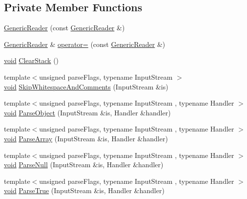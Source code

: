 \subsection*{Private Member Functions}
\begin{DoxyCompactItemize}
\item 
\hyperlink{classGenericReader_ac767384e34b7078fa9f97ba57c884328}{Generic\+Reader} (const \hyperlink{classGenericReader}{Generic\+Reader} \&)
\item 
\hyperlink{classGenericReader}{Generic\+Reader} \& \hyperlink{classGenericReader_ab07a979626cfa121365bb09b61558c11}{operator=} (const \hyperlink{classGenericReader}{Generic\+Reader} \&)
\item 
\hyperlink{imgui__impl__opengl3__loader_8h_ac668e7cffd9e2e9cfee428b9b2f34fa7}{void} \hyperlink{classGenericReader_a1c3db4c395db98714ffb257d559fb28e}{Clear\+Stack} ()
\item 
{\footnotesize template$<$unsigned parse\+Flags, typename Input\+Stream $>$ }\\\hyperlink{imgui__impl__opengl3__loader_8h_ac668e7cffd9e2e9cfee428b9b2f34fa7}{void} \hyperlink{classGenericReader_a4d01a1cbfbb63744361af3e1eb98aa52}{Skip\+Whitespace\+And\+Comments} (Input\+Stream \&is)
\item 
{\footnotesize template$<$unsigned parse\+Flags, typename Input\+Stream , typename Handler $>$ }\\\hyperlink{imgui__impl__opengl3__loader_8h_ac668e7cffd9e2e9cfee428b9b2f34fa7}{void} \hyperlink{classGenericReader_af7943451d58ae465e9803d5a78beeb90}{Parse\+Object} (Input\+Stream \&is, Handler \&handler)
\item 
{\footnotesize template$<$unsigned parse\+Flags, typename Input\+Stream , typename Handler $>$ }\\\hyperlink{imgui__impl__opengl3__loader_8h_ac668e7cffd9e2e9cfee428b9b2f34fa7}{void} \hyperlink{classGenericReader_a8f226bb3c17b232ce142594b7620c8a4}{Parse\+Array} (Input\+Stream \&is, Handler \&handler)
\item 
{\footnotesize template$<$unsigned parse\+Flags, typename Input\+Stream , typename Handler $>$ }\\\hyperlink{imgui__impl__opengl3__loader_8h_ac668e7cffd9e2e9cfee428b9b2f34fa7}{void} \hyperlink{classGenericReader_ae624956124c98a85d23decd86a406a0b}{Parse\+Null} (Input\+Stream \&is, Handler \&handler)
\item 
{\footnotesize template$<$unsigned parse\+Flags, typename Input\+Stream , typename Handler $>$ }\\\hyperlink{imgui__impl__opengl3__loader_8h_ac668e7cffd9e2e9cfee428b9b2f34fa7}{void} \hyperlink{classGenericReader_a762f074e0f99c71f0a82cff19bb763cd}{Parse\+True} (Input\+Stream \&is, Handler \&handler)

\end{DoxyCompactItemize}
